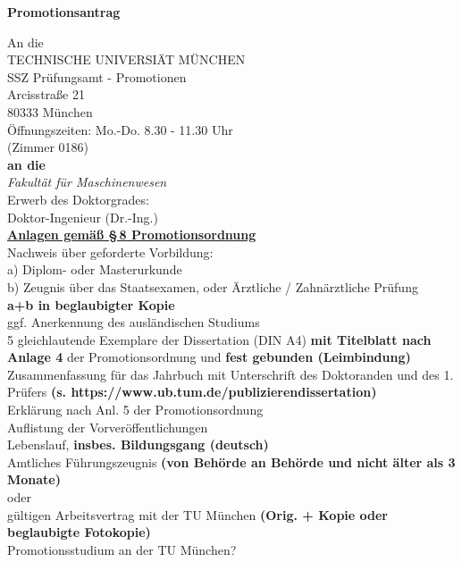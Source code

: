 \textbf{\Large Promotionsantrag}
  \begin{multicols}{2}
  \small
  \raggedright
    An die\\
    TECHNISCHE UNIVERSIÄT MÜNCHEN\\
    SSZ Prüfungsamt - Promotionen\\
    Arcisstraße 21\\
    80333 München\\
    Öffnungszeiten: Mo.-Do. 8.30 - 11.30 Uhr\\
    (Zimmer 0186)\\[0.5em]
    \textbf{an die}\\[0.5em]
    \emph{Fakult\"{a}t f\"{u}r Maschinenwesen}\\[0.5em]
    Erwerb des Doktorgrades:\\
    Doktor-Ingenieur (Dr.-Ing.)\\[1em]
    \underline{\textbf{Anlagen gemäß \S\,8 Promotionsordnung}}\\[1em]
    Nachweis über geforderte Vorbildung:\\
      a) Diplom- oder Masterurkunde\\
      b) Zeugnis über das Staatsexamen, oder Ärztliche / Zahnärztliche Prüfung\\
      \textbf{a+b in beglaubigter Kopie}\\
      ggf. Anerkennung des ausländischen Studiums\\[0.5em]
      5 gleichlautende Exemplare der Dissertation (DIN A4) \textbf{mit Titelblatt nach Anlage 4} der Promotionsordnung und \textbf{fest gebunden (Leimbindung)}\\[0.5em]
      Zusammenfassung für das Jahrbuch mit Unterschrift des Doktoranden und des 1. Prüfers \textbf{(s. https://www.ub.tum.de/publizieren\-dissertation)}\\[0.5em]
      Erklärung nach Anl. 5 der Promotionsordnung\\[0.5em]
      Auflistung der Vorveröffentlichungen\\[0.5em]
      Lebenslauf, \textbf{insbes. Bildungsgang (deutsch)}\\[0.5em]
      Amtliches Führungszeugnis \textbf{(von Behörde an Behörde und nicht älter als 3 Monate)}\\
      {\centering oder}\\
      gültigen Arbeitsvertrag mit der TU München \textbf{(Orig. + Kopie oder beglaubigte Fotokopie)}\\[0.5em]
      Promotionsstudium an der TU München?\\

\end{multicols}
